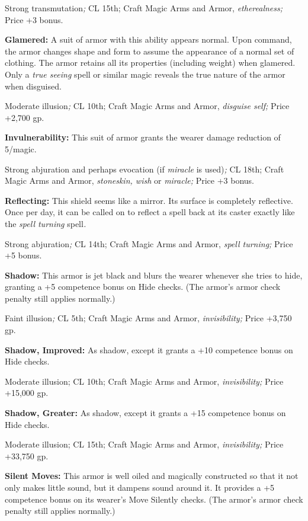 \documentclass{article}
\begin{document}
Strong transmutation\textit{; }CL 15th; Craft Magic Arms and Armor, \textit{etherealness; 
}Price +3 bonus.

\textbf{Glamered: }A suit of armor with this ability appears normal. Upon command, 
the armor changes shape and form to assume the appearance of a normal set of clothing. 
The armor retains all its properties (including weight) when glamered. Only a \textit{true 
seeing }spell or similar magic reveals the true nature of the armor when disguised.

Moderate illusion\textit{; }CL 10th; Craft Magic Arms and Armor, \textit{disguise 
self; }Price +2,700 gp.

\textbf{Invulnerability:} This suit of armor grants the wearer damage reduction 
of 5/magic.

Strong abjuration and perhaps evocation (if \textit{miracle }is used)\textit{; 
}CL 18th; Craft Magic Arms and Armor, \textit{stoneskin, wish }or \textit{miracle; 
}Price +3 bonus.

\textbf{Reflecting: }This shield seems like a mirror. Its surface is completely 
reflective. Once per day, it can be called on to reflect a spell back at its caster 
exactly like the \textit{spell turning }spell\textit{.}

Strong abjuration\textit{; }CL 14th; Craft Magic Arms and Armor, \textit{spell 
turning; }Price +5 bonus.

\textbf{Shadow:} This armor is jet black and blurs the wearer whenever she tries 
to hide, granting a +5 competence bonus on Hide checks. (The armor's armor check 
penalty still applies normally.)

Faint illusion\textit{; }CL 5th; Craft Magic Arms and Armor, \textit{invisibility; 
}Price +3,750 gp.

\textbf{Shadow, Improved:} As shadow, except it grants a +10 competence bonus on 
Hide checks.

Moderate illusion; CL 10th; Craft Magic Arms and Armor, \textit{invisibility; }Price 
+15,000 gp.

\textbf{Shadow, Greater:} As shadow, except it grants a +15 competence bonus on 
Hide checks.

Moderate illusion; CL 15th; Craft Magic Arms and Armor, \textit{invisibility; }Price 
+33,750 gp.

\textbf{Silent Moves: }This armor is well oiled and magically constructed so that 
it not only makes little sound, but it dampens sound around it. It provides a +5 
competence bonus on its wearer's Move Silently checks. (The armor's armor check 
penalty still applies normally.)
\end{document}
